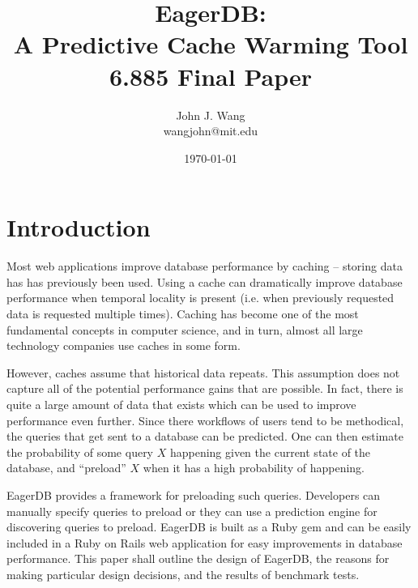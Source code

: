\documentclass[12pt]{article}
\title{EagerDB:\\
A Predictive Cache Warming Tool\\
6.885 Final Paper
}
\author{
John J. Wang\\
wangjohn@mit.edu\\
}
\date{\today}
\begin{document}
\maketitle


\section{Introduction}

Most web applications improve database performance by caching -- storing data has has previously been used. Using a cache can dramatically improve database performance when temporal locality is present (i.e. when previously requested data is requested multiple times). Caching has become one of the most fundamental concepts in computer science, and in turn, almost all large technology companies use caches in some form.

However, caches assume that historical data repeats. This assumption does not capture all of the potential performance gains that are possible. In fact, there is quite a large amount of data that exists which can be used to improve performance even further. Since there workflows of users tend to be methodical, the queries that get sent to a database can be predicted. One can then estimate the probability of some query $X$ happening given the current state of the database, and ``preload'' $X$ when it has a high probability of happening.

EagerDB provides a framework for preloading such queries. Developers can manually specify queries to preload or they can use a prediction engine for discovering queries to preload. EagerDB is built as a Ruby gem and can be easily included in a Ruby on Rails web application for easy improvements in database performance. This paper shall outline the design of EagerDB, the reasons for making particular design decisions, and the results of benchmark tests.
\end{document}
